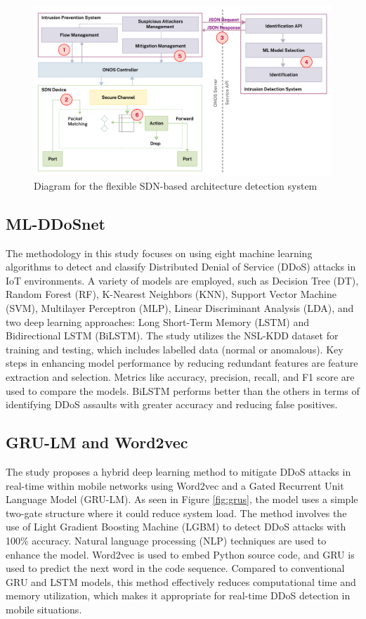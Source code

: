 \documentclass[a4paper, 12pt]{article}
\begin{document}
\begin{figure}[H]
    \centering
    \includegraphics[width=0.7\linewidth]{IMG_0250.jpeg}
    \caption{Diagram for the flexible SDN-based architecture detection system \protect{}}
    \label{fig:2}
\end{figure}

\subsection{ML-DDoSnet} 
The methodology in this study focuses on using eight machine learning algorithms to detect and classify Distributed Denial of Service (DDoS) attacks in IoT environments. A variety of models are employed, such as Decision Tree (DT), Random Forest (RF), K-Nearest Neighbors (KNN), Support Vector Machine (SVM), Multilayer Perceptron (MLP), Linear Discriminant Analysis (LDA), and two deep learning approaches: Long Short-Term Memory (LSTM) and Bidirectional LSTM (BiLSTM). The study utilizes the NSL-KDD dataset for training and testing, which includes labelled data (normal or anomalous). Key steps in enhancing model performance by reducing redundant features are feature extraction and selection. Metrics like accuracy, precision, recall, and F1 score are used to compare the models. BiLSTM performs better than the others in terms of identifying DDoS assaults with greater accuracy and reducing false positives. 

\clearpage

\subsection{GRU-LM and Word2vec}
The study proposes a hybrid deep learning method to mitigate DDoS attacks in real-time within mobile networks using Word2vec and a Gated Recurrent Unit Language Model (GRU-LM). As seen in Figure \ref{fig:grus}, the model uses a simple two-gate structure where it could reduce system load. The method involves the use of Light Gradient Boosting Machine (LGBM) to detect DDoS attacks with 100\% accuracy. Natural language processing (NLP) techniques are used to enhance the model. Word2vec is used to embed Python source code, and GRU is used to predict the next word in the code sequence. Compared to conventional GRU and LSTM models, this method effectively reduces computational time and memory utilization, which makes it appropriate for real-time DDoS detection in mobile situations. 
\end{document}

